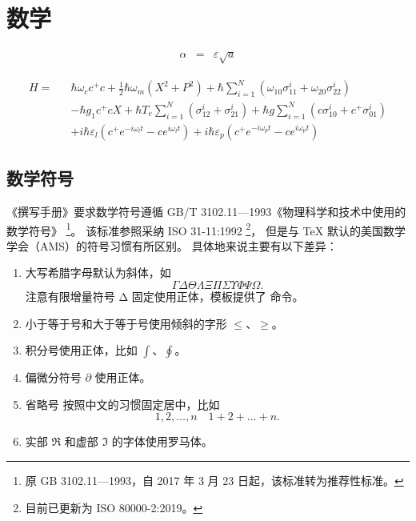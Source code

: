 
\chapter{数学}

\begin{eqnarray}
	\alpha & = & \varepsilon \sqrt{a} 
\end{eqnarray}

\begin{eqnarray}
	H=&&\hbar \omega_{c} c^{+} c+\frac{1}{2} \hbar \omega_{m}\left(X^{2}+P^{2}\right)+\hbar \sum_{i=1}^{N}\left(\omega_{10} \sigma_{11}^{i}+\omega_{20} \sigma_{22}^{i}\right) \\
	&&-\hbar g_{1} c^{+} c X+\hbar T_{e} \sum_{i=1}^{N}\left(\sigma_{12}^{i}+\sigma_{21}^{i}\right)+\hbar g \sum_{i=1}^{N}\left(c \sigma_{10}^{i}+c^{+} \sigma_{01}^{i}\right) \\
	&&+i \hbar \varepsilon_{l}\left(c^{+} e^{-i \omega_{l} t}-c e^{i \omega_{l} t}\right)+i \hbar \varepsilon_{p}\left(c^{+} e^{-i \omega_{p} t}-c e^{i \omega_{p} t}\right)
\end{eqnarray}

\section{数学符号}

《撰写手册》\cite{PhysRevLett.81.3811,baker1995future}要求数学符号遵循 GB/T 3102.11—1993《物理科学和技术中使用的数学符号》
\footnote{原 GB 3102.11—1993，自 2017 年 3 月 23 日起，该标准转为推荐性标准。}。
该标准参照采纳 ISO 31-11:1992 \footnote{目前已更新为 ISO 80000-2:2019。}，
但是与 \TeX{} 默认的美国数学学会（AMS）的符号习惯有所区别。
具体地来说主要有以下差异：
\begin{enumerate}
  \item 大写希腊字母默认为斜体，如
    \begin{equation*}
      \Gamma \Delta \Theta \Lambda \Xi \Pi \Sigma \Upsilon \Phi \Psi \Omega.
    \end{equation*}
    注意有限增量符号 $\increment$ 固定使用正体，模板提供了  命令。
  \item 小于等于号和大于等于号使用倾斜的字形 $\le$、$\ge$。
  \item 积分号使用正体，比如 $\int$、$\oint$。
  \item
    偏微分符号 $\partial$ 使用正体。
  \item
    省略号  按照中文的习惯固定居中，比如
    \begin{equation*}
      1, 2, \dots, n \quad 1 + 2 + \dots + n.
    \end{equation*}
  \item
    实部 $\Re$ 和虚部 $\Im$ 的字体使用罗马体。
\end{enumerate}

